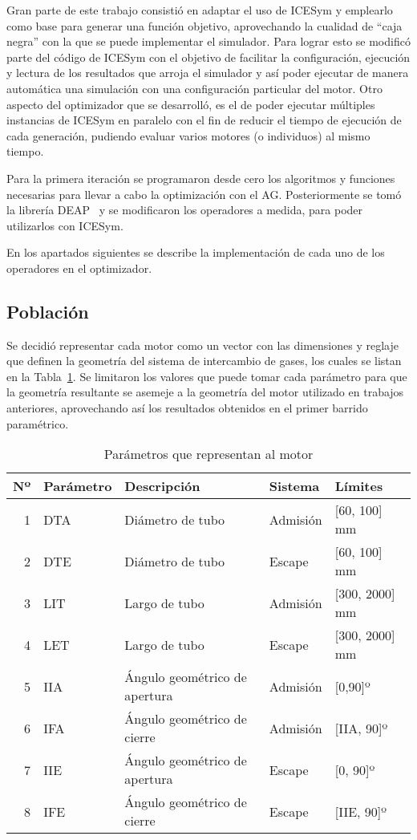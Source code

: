 Gran parte de este trabajo consistió en adaptar el uso de ICESym y emplearlo
como base para generar una función objetivo, aprovechando la cualidad de ``caja
negra'' con la que se puede implementar el simulador.
%
Para lograr esto se modificó parte del código de ICESym con el objetivo de
facilitar la configuración, ejecución y lectura de los resultados que arroja el
simulador y así poder ejecutar de manera automática una simulación con una
configuración particular del motor.
%
Otro aspecto del optimizador que se desarrolló, es el de poder ejecutar
múltiples instancias de ICESym en paralelo con el fin de reducir el tiempo de
ejecución de cada generación, pudiendo evaluar varios motores (o individuos) al
mismo tiempo.

Para la primera iteración se programaron desde cero los algoritmos y funciones
necesarias para llevar a cabo la optimización con el AG.
%
Posteriormente se tomó la librería DEAP~\parencite{DEAP_JMLR2012} y se
modificaron los operadores a medida, para poder utilizarlos con ICESym.

En los apartados siguientes se describe la implementación de cada uno de los
operadores en el optimizador.

\subsection{Población}
%
Se decidió representar cada motor como un vector con las dimensiones y reglaje
que definen la geometría del sistema de intercambio de gases, los cuales se
listan en la Tabla~\ref{tab:param_motor}.
%
Se limitaron los valores que puede tomar cada parámetro para que la geometría
resultante se asemeje a la geometría del motor utilizado en trabajos anteriores,
aprovechando así los resultados obtenidos en el primer barrido paramétrico.

\begin{table}[h!]
  \centering
  \begin{tabular}{rllll} \toprule
    Nº & Parámetro & Descripción & Sistema & Límites \\ \midrule
    1 & DTA & Diámetro de tubo & Admisión & [60, 100] mm \\
    2 & DTE & Diámetro de tubo & Escape & [60, 100] mm\\
    3 & LIT & Largo de tubo & Admisión & [300, 2000] mm\\
    4 & LET & Largo de tubo & Escape & [300, 2000] mm\\
    5 & IIA & Ángulo geométrico de apertura & Admisión & [0,90]º \\
    6 & IFA & Ángulo geométrico de cierre & Admisión & [IIA, 90]º \\
    7 & IIE & Ángulo geométrico de apertura & Escape & [0, 90]º \\
    8 & IFE & Ángulo geométrico de cierre & Escape & [IIE, 90]º \\ \bottomrule
  \end{tabular}
  \caption{Parámetros que representan al motor}\label{tab:param_motor}
\end{table}

